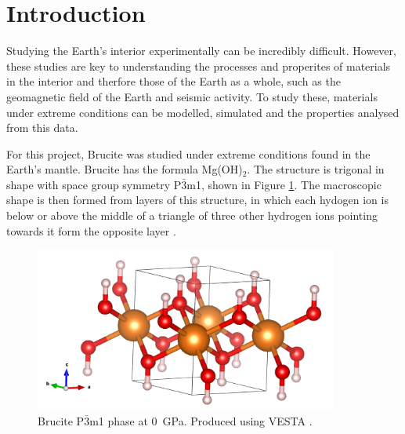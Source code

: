 \documentclass[a4paper,12pt]{article}
\begin{document}
\section{Introduction}
Studying the Earth's interior experimentally can be incredibly difficult. However, these studies are key to understanding the processes and properites of materials in the interior and therfore those of the Earth as a whole, such as the geomagnetic field of the Earth and seismic activity. To study these, materials under extreme conditions can be modelled, simulated and the properties analysed from this data.

For this project, Brucite was studied under extreme conditions found in the Earth's mantle. Brucite has the formula Mg(OH)$_2$. The structure is trigonal in shape with space group symmetry P$\bar{3}$m1, shown in Figure \ref{Fig1}. The macroscopic shape is then formed from layers of this structure, in which each hydogen ion is below or above the middle of a triangle of three other hydrogen ions pointing towards it form the opposite layer \cite{HermannKey}. 
\begin{figure}[h!!!!]
	\centering
	\includegraphics[width=10cm]{figures/p-3m1_p0_gs.png}
	\caption{Brucite P$\bar{3}$m1 phase at \SI{0}{\GPa}. Produced using VESTA \cite{VESTA}.}
	\label{Fig1}
\end{figure}
\end{document}
